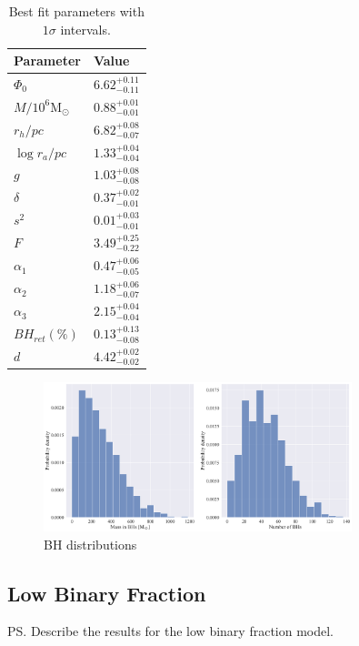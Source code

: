 \begin{table}
	\centering
	\caption{Best fit parameters with $1\sigma$ intervals.}
	\begin{tabular}{l l}

		\hline
		Parameter                 & Value                  \\
		\hline
		$\Phi_0$                  & $6.62^{+0.11}_{-0.11}$ \\
		$M/10^6 \mathrm{M}_\odot$ & $0.88^{+0.01}_{-0.01}$ \\
		$r_h / pc$                & $6.82^{+0.08}_{-0.07}$ \\
		$\log{r_a / pc}$          & $1.33^{+0.04}_{-0.04}$ \\
		$g$                       & $1.03^{+0.08}_{-0.08}$ \\
		$\delta$                  & $0.37^{+0.02}_{-0.01}$ \\
		$s^2$                     & $0.01^{+0.03}_{-0.01}$ \\
		$F$                       & $3.49^{+0.25}_{-0.22}$ \\
		$\alpha_1$                & $0.47^{+0.06}_{-0.05}$ \\
		$\alpha_2$                & $1.18^{+0.06}_{-0.07}$ \\
		$\alpha_3$                & $2.15^{+0.04}_{-0.04}$ \\
		$BH_{ret} (\%)$           & $0.13^{+0.13}_{-0.08}$ \\
		$d$                       & $4.42^{+0.02}_{-0.02}$ \\
		\hline
	\end{tabular}
	\label{tab:parameters_nobin}
\end{table}

\begin{figure}
	\centering
	\includegraphics[width=0.8\textwidth]{figures/prev_nobin/BH_dists.png}
	\caption{BH distributions}
	\label{fig:prev_nobin_BH_dists}
\end{figure}


\subsection{Low Binary Fraction}
\ps{Describe the results for the low binary fraction model.}


